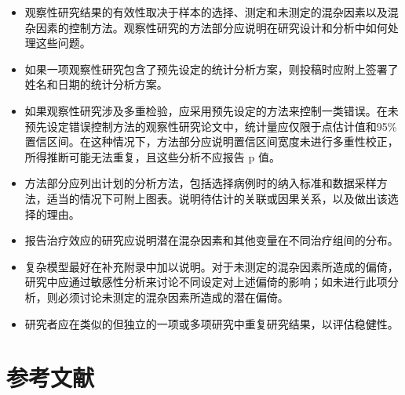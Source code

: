 \documentclass[
  chinese-hans,
  letterpaper,
  DIV=11,
  numbers=noendperiod]{scrreprt}
\begin{document}
\begin{itemize}
\item
  观察性研究结果的有效性取决于样本的选择、测定和未测定的混杂因素以及混杂因素的控制方法。观察性研究的方法部分应说明在研究设计和分析中如何处理这些问题。
\item
  如果一项观察性研究包含了预先设定的统计分析方案，则投稿时应附上签署了姓名和日期的统计分析方案。
\item
  如果观察性研究涉及多重检验，应采用预先设定的方法来控制一类错误。在未预先设定错误控制方法的观察性研究论文中，统计量应仅限于点估计值和95\%置信区间。在这种情况下，方法部分应说明置信区间宽度未进行多重性校正，所得推断可能无法重复，且这些分析不应报告
  p 值。
\item
  方法部分应列出计划的分析方法，包括选择病例时的纳入标准和数据采样方法，适当的情况下可附上图表。说明待估计的关联或因果关系，以及做出该选择的理由。
\item
  报告治疗效应的研究应说明潜在混杂因素和其他变量在不同治疗组间的分布。
\item
  复杂模型最好在补充附录中加以说明。对于未测定的混杂因素所造成的偏倚，研究中应通过敏感性分析来讨论不同设定对上述偏倚的影响；如未进行此项分析，则必须讨论未测定的混杂因素所造成的潜在偏倚。
\item
  研究者应在类似的但独立的一项或多项研究中重复研究结果，以评估稳健性。
\end{itemize}

\section{参考文献}\label{ux53c2ux8003ux6587ux732e-2}
\end{document}

